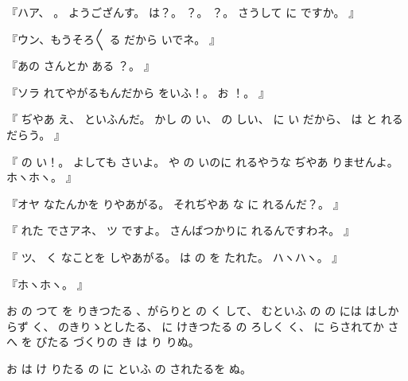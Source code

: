 『ハア、
。
ようござんす。
は？。
？。
？。
さうして
に
ですか。
』

『ウン、もうそろ〳〵
る
だから
いでネ。
』

『あの
さんとか
ある
？。
』

『ソラ
れてやがるもんだから
をいふ！。
お
！。
』

『
ぢやあ
え、
といふんだ。
かし
の
い、
の
しい、
に
い
だから、
は
と
れるだらう。
』

『
の
い！。
よしても
さいよ。
や
の
いのに
れるやうな
ぢやあ
りませんよ。
ホヽホヽ。
』

『オヤ
なたんかを
りやあがる。
それぢやあ
な
に
れるんだ？。
』

『
れた
でさアネ、
ツ
ですよ。
さんばつかりに
れるんですわネ。
』

『
ツ、
く
なことを
しやあがる。
は
の
を
たれた。
ハヽハヽ。
』

『ホヽホヽ。
』

お
の
つて
を
りきつたる
、がらりと
の
く
して、
むといふ
の
の
には
はしからず
く、
のきりゝとしたる、
に
けきつたる
の
ろしく
く、
に
らされてか
さへ
を
びたる
づくりの
き
は
り
りぬ。

お
は
け
りたる
の
に
といふ
の
されたるを
ぬ。

